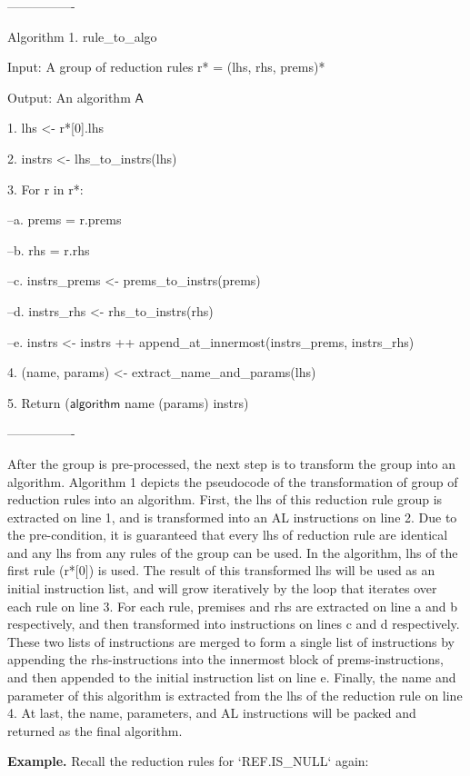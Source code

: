 ----------------

Algorithm 1. rule\_to\_algo

Input: A group of reduction rules r* = (lhs, rhs, prems)*

Output: An algorithm $\mathsf{A}$

1. lhs <- r*[0].lhs

2. instrs <- lhs\_to\_instrs(lhs)

3. For r in r*:

--a. prems = r.prems

--b. rhs = r.rhs

--c. instrs\_prems <- prems\_to\_instrs(prems)

--d. instrs\_rhs <- rhs\_to\_instrs(rhs)

--e. instrs <- instrs ++ append\_at\_innermost(instrs\_prems, instrs\_rhs)

4. (name, params) <- extract\_name\_and\_params(lhs)

5. Return ($\mathsf{algorithm}$ name (params) {instrs})

----------------


After the group is pre-processed, the next step is to transform the group into
an algorithm. Algorithm 1 depicts the pseudocode of the transformation of group
of reduction rules into an algorithm.  First, the lhs of this reduction rule
group is extracted on line 1, and is transformed into an AL instructions on
line 2. Due to the pre-condition, it is guaranteed that every lhs of reduction
rule are identical and any lhs from any rules of the group can be used. In the
algorithm, lhs of the first rule (r*[0]) is used. The result of this
transformed lhs will be used as an initial instruction list, and will grow
iteratively by the loop that iterates over each rule on line 3.  For each rule,
premises and rhs are extracted on line a and b respectively, and then
transformed into instructions on lines c and d respectively. These two lists of
instructions are merged to form a single list of instructions by appending the
rhs-instructions into the innermost block of prems-instructions,
and then appended to the initial instruction list on line e.  Finally, the name and
parameter of this algorithm is extracted from the lhs of the reduction rule on
line 4. At last, the name, parameters, and AL instructions will be packed and
returned as the final algorithm.

\textbf{Example.} Recall the reduction rules for `REF.IS\_NULL` again:

